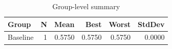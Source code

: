 \begin{table}[htbp]
\centering
\caption{Group-level summary}
\label{tab:group-summary}
\begin{tabular}{lrrrrr}
\toprule
\textbf{Group} & \textbf{N} & \textbf{Mean} & \textbf{Best} & \textbf{Worst} & \textbf{StdDev} \\
\midrule
Baseline & 1 & 0.5750 & 0.5750 & 0.5750 & 0.0000 \\
\bottomrule
\end{tabular}
\end{table}